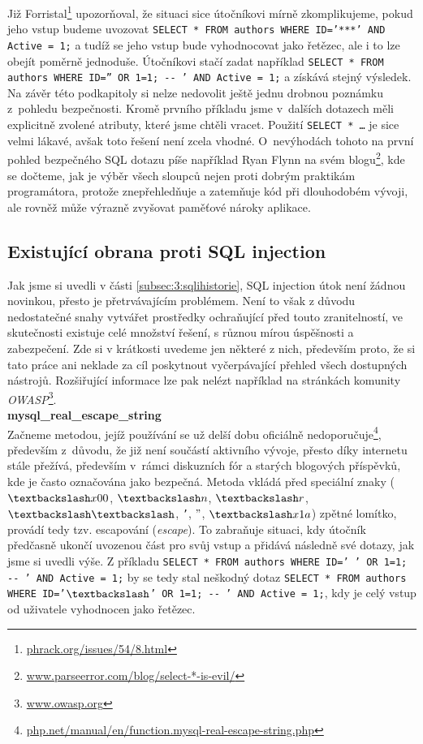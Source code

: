 Již Forristal\footnote{\url{phrack.org/issues/54/8.html}} upozorňoval, že situaci sice útočníkovi mírně zkomplikujeme,
pokud jeho vstup budeme uvozovat \texttt{SELECT * FROM authors WHERE ID='***' AND Active = 1;} a tudíž se jeho vstup bude vyhodnocovat jako řetězec,
ale i to lze obejít poměrně jednoduše. Útočníkovi stačí zadat například \texttt{SELECT * FROM authors WHERE ID='' OR 1=1; -{}- ' AND Active = 1;}
a získává stejný výsledek. \\

Na závěr této podkapitoly si nelze nedovolit ještě jednu drobnou poznámku z~pohledu bezpečnosti. Kromě prvního příkladu jsme
v~dalších dotazech měli explicitně zvolené atributy, které jsme chtěli vracet. Použití \texttt{SELECT * \dots} je sice
velmi lákavé, avšak toto řešení není zcela vhodné. O~nevýhodách tohoto na první pohled bezpečného SQL dotazu píše například Ryan Flynn na svém 
blogu\footnote{\url{www.parseerror.com/blog/select-*-is-evil/}}, kde se dočteme, jak je výběr všech sloupců nejen proti dobrým praktikám 
programátora, protože znepřehledňuje a zatemňuje kód při dlouhodobém vývoji, ale rovněž může výrazně zvyšovat paměťové nároky aplikace. 

\subsection{Existující obrana proti SQL injection}\label{subsec:3:tools}
Jak jsme si uvedli v části \ref{subsec:3:sqlihistorie}, SQL injection útok není žádnou novinkou, přesto je přetrvávajícím problémem. 
Není to však z důvodu nedostatečné snahy vytvářet prostředky ochraňující před touto zranitelností, ve skutečnosti existuje celé množství 
řešení, s různou mírou úspěšnosti a zabezpečení. Zde si v krátkosti uvedeme jen některé z nich, především proto, že si tato práce ani neklade za cíl 
poskytnout vyčerpávající přehled všech dostupných nástrojů. Rozšiřující informace lze pak nelézt například na stránkách komunity 
\textit{OWASP}\footnote{\url{www.owasp.org}}. \\

\Bat{} \textbf{mysql\_real\_escape\_string} \\
Začneme metodou, jejíž používání se už delší dobu oficiálně nedoporučuje\footnote{\url{php.net/manual/en/function.mysql-real-escape-string.php}},
především z~důvodu, že již není součástí aktivního vývoje, přesto díky internetu stále přežívá, především v~rámci diskuzních fór a starých blogových příspěvků, 
kde je často označována jako bezpečná.
\newpage
Metoda vkládá před speciální znaky ($\textbackslash x00$, $\textbackslash n$, $\textbackslash r$, $\textbackslash \textbackslash$, 
\texttt{'}, $"$, $\textbackslash x1a$) zpětné lomítko, provádí tedy tzv. escapování (\textit{escape}). To zabraňuje situaci, kdy útočník předčasně 
ukončí uvozenou část pro svůj vstup a přidává následně své dotazy, jak jsme si uvedli výše. Z příkladu 
\texttt{SELECT * FROM authors WHERE ID=' ' OR 1=1; -{}- ' AND Active = 1;} by se tedy stal neškodný dotaz 
\texttt{SELECT * FROM authors WHERE ID='$\textbackslash$' OR 1=1; -{}- ' AND Active = 1;}, kdy je celý vstup od uživatele vyhodnocen 
jako řetězec. \\ 

